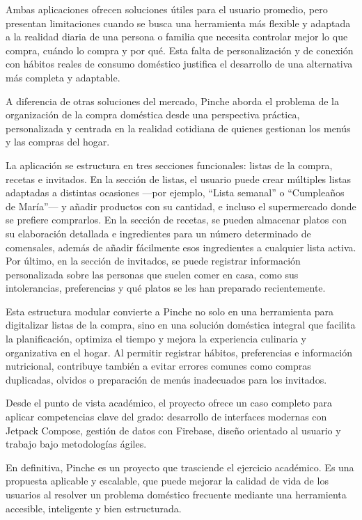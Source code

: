 Ambas aplicaciones ofrecen soluciones útiles para el usuario promedio, pero presentan limitaciones cuando se busca una herramienta más flexible y adaptada a la realidad diaria de una persona o familia que necesita controlar mejor lo que compra, cuándo lo compra y por qué. Esta falta de personalización y de conexión con hábitos reales de consumo doméstico justifica el desarrollo de una alternativa más completa y adaptable.

A diferencia de otras soluciones del mercado, Pinche aborda el problema de la organización de la compra doméstica desde una perspectiva práctica, personalizada y centrada en la realidad cotidiana de quienes gestionan los menús y las compras del hogar.

La aplicación se estructura en tres secciones funcionales: listas de la compra, recetas e invitados. En la sección de listas, el usuario puede crear múltiples listas adaptadas a distintas ocasiones —por ejemplo, “Lista semanal” o “Cumpleaños de María”— y añadir productos con su cantidad, e incluso el supermercado donde se prefiere comprarlos. En la sección de recetas, se pueden almacenar platos con su elaboración detallada e ingredientes para un número determinado de comensales, además de añadir fácilmente esos ingredientes a cualquier lista activa. Por último, en la sección de invitados, se puede registrar información personalizada sobre las personas que suelen comer en casa, como sus intolerancias, preferencias y qué platos se les han preparado recientemente.

Esta estructura modular convierte a Pinche no solo en una herramienta para digitalizar listas de la compra, sino en una solución doméstica integral que facilita la planificación, optimiza el tiempo y mejora la experiencia culinaria y organizativa en el hogar. Al permitir registrar hábitos, preferencias e información nutricional, contribuye también a evitar errores comunes como compras duplicadas, olvidos o preparación de menús inadecuados para los invitados.

Desde el punto de vista académico, el proyecto ofrece un caso completo para aplicar competencias clave del grado: desarrollo de interfaces modernas con Jetpack Compose, gestión de datos con Firebase, diseño orientado al usuario y trabajo bajo metodologías ágiles.

En definitiva, Pinche es un proyecto que trasciende el ejercicio académico. Es una propuesta aplicable y escalable, que puede mejorar la calidad de vida de los usuarios al resolver un problema doméstico frecuente mediante una herramienta accesible, inteligente y bien estructurada.